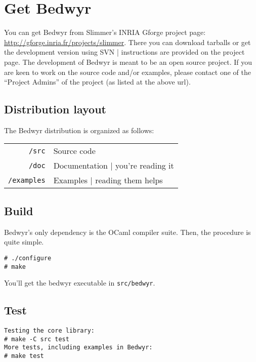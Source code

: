 \documentclass{article}
\begin{document}
\section{Get Bedwyr}
\label{sec:install}

You can get Bedwyr from Slimmer's INRIA Gforge project page:
\url{http://gforge.inria.fr/projects/slimmer}.
There you can download tarballs or get the development version using SVN
| instructions are provided on the project page.  The development of
Bedwyr is meant to be an open source project.  If you are keen
to work on the source code and/or examples, please contact
one of the ``Project Admins'' of the project (as listed at the above url).

\subsection{Distribution layout}

The Bedwyr distribution is organized as follows:

\begin{tabular}{r@{\quad}l}
  \texttt{/src}      & Source code \\
  \texttt{/doc}      &  Documentation | you're reading it \\
  \texttt{/examples} &  Examples | reading them helps
\end{tabular}

\subsection{Build}

Bedwyr's only dependency is the OCaml compiler suite.
Then, the procedure is quite simple.

\begin{verbatim}
# ./configure
# make
\end{verbatim}

You'll get the bedwyr executable in \texttt{src/bedwyr}.

\subsection{Test}

\begin{verbatim}
Testing the core library:
# make -C src test
More tests, including examples in Bedwyr:
# make test
\end{verbatim}
\end{document}
